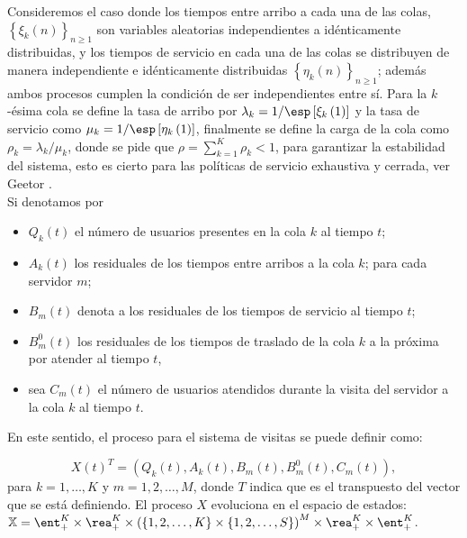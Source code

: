 Consideremos el caso donde los tiempos entre arribo a cada una de
las colas, $\left\{\xi_{k}\left(n\right)\right\}_{n\geq1}$ son
variables aleatorias independientes a id\'enticamente
distribuidas, y los tiempos de servicio en cada una de las colas
se distribuyen de manera independiente e id\'enticamente
distribuidas $\left\{\eta_{k}\left(n\right)\right\}_{n\geq1}$;
adem\'as ambos procesos cumplen la condici\'on de ser
independientes entre s\'i. Para la $k$-\'esima cola se define la
tasa de arribo por
$\lambda_{k}=1/\esp\left[\xi_{k}\left(1\right)\right]$ y la tasa
de servicio como
$\mu_{k}=1/\esp\left[\eta_{k}\left(1\right)\right]$, finalmente se
define la carga de la cola como $\rho_{k}=\lambda_{k}/\mu_{k}$,
donde se pide que $\rho=\sum_{k=1}^{K}\rho_{k}<1$, para garantizar
la estabilidad del sistema, esto es cierto para las pol\'iticas de
servicio exhaustiva y cerrada, ver Geetor \cite{Getoor}.\\

Si denotamos por
\begin{itemize}
\item $Q_{k}\left(t\right)$ el n\'umero de usuarios presentes en
la cola $k$ al tiempo $t$; \item $A_{k}\left(t\right)$ los
residuales de los tiempos entre arribos a la cola $k$; para cada
servidor $m$; \item $B_{m}\left(t\right)$ denota a los residuales
de los tiempos de servicio al tiempo $t$; \item
$B_{m}^{0}\left(t\right)$ los residuales de los tiempos de
traslado de la cola $k$ a la pr\'oxima por atender al tiempo $t$,

\item sea
$C_{m}\left(t\right)$ el n\'umero de usuarios atendidos durante la
visita del servidor a la cola $k$ al tiempo $t$.
\end{itemize}


En este sentido, el proceso para el sistema de visitas se puede
definir como:

\begin{equation}\label{Esp.Edos.Down}
X\left(t\right)^{T}=\left(Q_{k}\left(t\right),A_{k}\left(t\right),B_{m}\left(t\right),B_{m}^{0}\left(t\right),C_{m}\left(t\right)\right),
\end{equation}
para $k=1,\ldots,K$ y $m=1,2,\ldots,M$, donde $T$ indica que es el
transpuesto del vector que se est\'a definiendo. El proceso $X$
evoluciona en el espacio de estados:
$\mathbb{X}=\ent_{+}^{K}\times\rea_{+}^{K}\times\left(\left\{1,2,\ldots,K\right\}\times\left\{1,2,\ldots,S\right\}\right)^{M}\times\rea_{+}^{K}\times\ent_{+}^{K}$.\\

